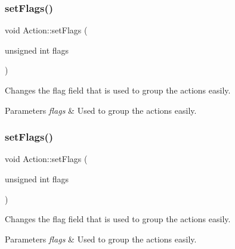 \mbox{\label{classAction_a848b0f80143acd07c814735463a8e920}} 
\subsubsection{\texorpdfstring{set\+Flags()}{setFlags()}\hspace{0.1cm}{\footnotesize\ttfamily [1/2]}}
{\footnotesize\ttfamily void Action\+::set\+Flags (\begin{DoxyParamCaption}\item[{unsigned int}]{flags }\end{DoxyParamCaption})\hspace{0.3cm}{\ttfamily [inline]}}

Changes the flag field that is used to group the actions easily.


\begin{DoxyParams}{Parameters}
{\em flags} & Used to group the actions easily. \\
\hline
\end{DoxyParams}
\mbox{\label{classAction_a848b0f80143acd07c814735463a8e920}} 
\subsubsection{\texorpdfstring{set\+Flags()}{setFlags()}\hspace{0.1cm}{\footnotesize\ttfamily [2/2]}}
{\footnotesize\ttfamily void Action\+::set\+Flags (\begin{DoxyParamCaption}\item[{unsigned int}]{flags }\end{DoxyParamCaption})\hspace{0.3cm}{\ttfamily [inline]}}

Changes the flag field that is used to group the actions easily.


\begin{DoxyParams}{Parameters}
{\em flags} & Used to group the actions easily. \\
\hline
\end{DoxyParams}
\mbox{\label{classAction_aa58699929e174e97a057b51e83fcc1f3}} 
